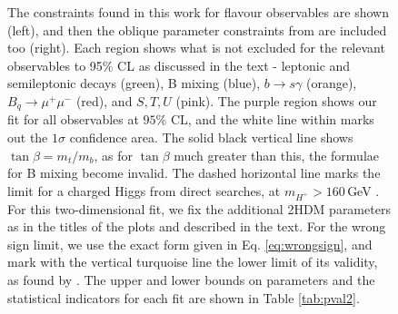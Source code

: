 \documentclass[a4paper,12pt]{article}
\begin{document}
\begin{figure}[H]
{    The constraints found in this work for flavour observables are shown (left), and then the oblique parameter constraints from \cite{james} are included too (right). 
    Each region shows what is not excluded for the relevant observables to 95\% CL as discussed in the text - leptonic and semileptonic decays (green), B mixing (blue), $b\to s\gamma$ (orange), $B_q\to\mu^+\mu^-$ (red), and $S,T,U$ (pink).
    The purple region shows our fit for all observables at $95\%$ CL, and the white line within marks out the $1\sigma$ confidence area. 
    The solid black vertical line shows $\tan\beta=m_t/m_b$, as for $\tan\beta$ much greater than this, the formulae for B mixing become invalid. 
    The dashed horizontal line marks the limit for a charged Higgs from direct searches, at $m_{H^+}>160\,$GeV \cite{dirhp}.
    For this two-dimensional fit, we fix the additional 2HDM parameters as in the titles of the plots and described in the text. 
    For the wrong sign limit, we use the exact form given in Eq. \ref{eq:wrongsign}, and mark with the vertical turquoise line the lower limit of its validity, as found by \cite{oliver}.
    The upper and lower bounds on parameters and the statistical indicators for each fit are shown in Table \ref{tab:pval2}.}
\end{figure}
\end{document}
